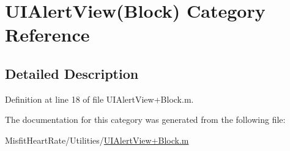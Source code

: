 \hypertarget{category_u_i_alert_view_07_block_08}{\section{U\+I\+Alert\+View(Block) Category Reference}
\label{category_u_i_alert_view_07_block_08}
}


\subsection{Detailed Description}


Definition at line 18 of file U\+I\+Alert\+View+\+Block.\+m.



The documentation for this category was generated from the following file\+:\begin{DoxyCompactItemize}
\item 
Misfit\+Heart\+Rate/\+Utilities/\hyperlink{_u_i_alert_view_09_block_8m}{U\+I\+Alert\+View+\+Block.\+m}\end{DoxyCompactItemize}

